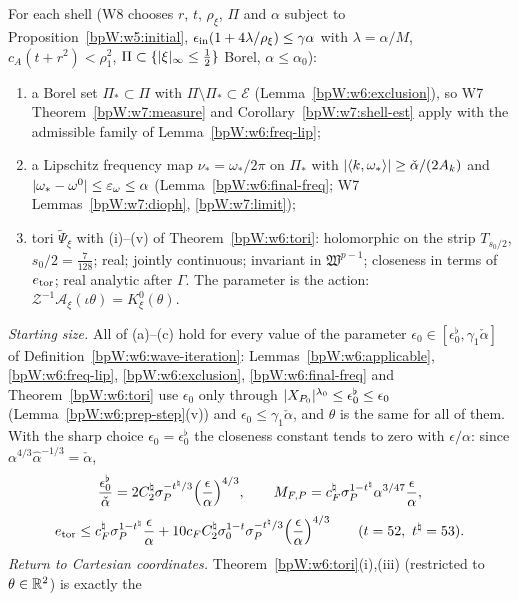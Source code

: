\begin{remark}\label{bpW:w6:to-w8}
For each shell (W8 chooses $r$, $t$, $\rho_\xi$, $\Pi$ and $\alpha$ subject to Proposition~\ref{bpW:w5:initial}, $\epsilon_{\rm in}(1+4\lambda/\rho_\xi)\le\gamma\alpha$
with $\lambda=\alpha/M$, $c_A(t+r^2)<\rho_1^2$, $\Pi\subset\{\lvert \xi\rvert_\infty\le\frac12\}$ Borel, $\alpha\le\alpha_0$):
\begin{enumerate}[label=(\alph*)]
\item a Borel set $\Pi_*\subset\Pi$ with $\Pi\setminus\Pi_*\subset\mathcal E$ (Lemma~\ref{bpW:w6:exclusion}), so W7 Theorem~\ref{bpW:w7:measure} and
  Corollary~\ref{bpW:w7:shell-est} apply with the admissible family of Lemma~\ref{bpW:w6:freq-lip};
\item a Lipschitz frequency map $\nu_*=\omega_*/2\pi$ on $\Pi_*$ with $\lvert \langle k,\omega_*\rangle\rvert\ge\check\alpha/(2A_k)$ and
  $\lvert \omega_*-\omega^0\rvert\le\varepsilon_\omega\le\alpha$ (Lemma~\ref{bpW:w6:final-freq}; W7 Lemmas~\ref{bpW:w7:dioph}, \ref{bpW:w7:limit});
\item tori $\tilde\Psi_\xi$ with (i)--(v) of Theorem~\ref{bpW:w6:tori}: holomorphic on the strip $T_{s_0/2}$, $s_0/2=\frac7{128}$; real; jointly
  continuous; invariant in $\mathfrak W^{p-1}$; closeness in terms of $e_{\rm tor}$; real analytic after $\Gamma$. The parameter is
  the action: $\mathcal Z^{-1}\mathcal A_\xi(\iota\theta)=K^0_\xi(\theta)$.
\end{enumerate}
\emph{Starting size.} All of (a)--(c) hold for every value of the parameter $\epsilon_0\in[\epsilon^\flat_0,\gamma_1\check\alpha]$ of
Definition~\ref{bpW:w6:wave-iteration}: Lemmas~\ref{bpW:w6:applicable}, \ref{bpW:w6:freq-lip}, \ref{bpW:w6:exclusion},
\ref{bpW:w6:final-freq} and Theorem~\ref{bpW:w6:tori} use $\epsilon_0$ only through $\lvert X_{P_0}\rvert^{\lambda_0}\le\epsilon^\flat_0\le\epsilon_0$
(Lemma~\ref{bpW:w6:prep-step}(v)) and $\epsilon_0\le\gamma_1\check\alpha$, and $\theta$ is the same for all of them. With the sharp choice
$\epsilon_0=\epsilon^\flat_0$ the closeness constant tends to zero with $\epsilon/\alpha$: since $\alpha^{4/3}\hat\alpha^{-1/3}=\check\alpha$,
\[\frac{\epsilon^\flat_0}{\check\alpha}=2C^\natural_2\sigma_P^{-t^\natural/3}\Bigl(\frac\epsilon\alpha\Bigr)^{4/3},\qquad
M_{F,P}=c^\natural_F\sigma_P^{1-t^\natural}\alpha^{3/47}\frac\epsilon\alpha,\]
\[e_{\rm tor}\le c^\natural_F\sigma_P^{1-t^\natural}\frac\epsilon\alpha+10c_FC^\natural_2\sigma_0^{1-t}\sigma_P^{-t^\natural/3}\Bigl(\frac\epsilon\alpha\Bigr)^{4/3}
\qquad(t=52,\ t^\natural=53).\]
\emph{Return to Cartesian coordinates.} Theorem~\ref{bpW:w6:tori}(i),(iii) (restricted to $\theta\in\mathbb{R}^2$) is exactly the

\end{remark}

